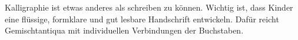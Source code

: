 Kalligraphie ist etwas anderes als schreiben zu können.
Wichtig ist, dass Kinder eine flüssige, formklare und gut lesbare Handschrift entwickeln.
Dafür reicht Gemischtantiqua mit individuellen Verbindungen der Buchstaben.